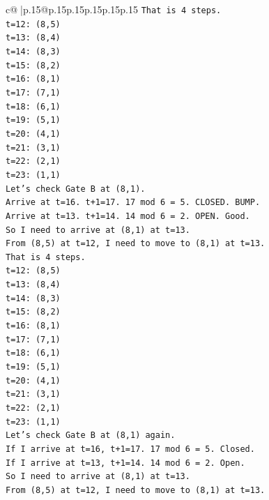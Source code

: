 \documentclass{article}
\begin{document}
{\begin{supertabular}{c@{$\;$}|p{.15\linewidth}@{}p{.15\linewidth}p{.15\linewidth}p{.15\linewidth}p{.15\linewidth}p{.15\linewidth}}
{{{\texttt{That is 4 steps.} \\
\texttt{t=12: (8,5)} \\
\texttt{t=13: (8,4)} \\
\texttt{t=14: (8,3)} \\
\texttt{t=15: (8,2)} \\
\texttt{t=16: (8,1)} \\
\texttt{t=17: (7,1)} \\
\texttt{t=18: (6,1)} \\
\texttt{t=19: (5,1)} \\
\texttt{t=20: (4,1)} \\
\texttt{t=21: (3,1)} \\
\texttt{t=22: (2,1)} \\
\texttt{t=23: (1,1)} \\
\texttt{Let's check Gate B at (8,1).} \\
\texttt{Arrive at t=16. t+1=17. 17 mod 6 = 5. CLOSED. BUMP.} \\
\texttt{Arrive at t=13. t+1=14. 14 mod 6 = 2. OPEN. Good.} \\
\texttt{So I need to arrive at (8,1) at t=13.} \\
\texttt{From (8,5) at t=12, I need to move to (8,1) at t=13.} \\
\texttt{That is 4 steps.} \\
\texttt{t=12: (8,5)} \\
\texttt{t=13: (8,4)} \\
\texttt{t=14: (8,3)} \\
\texttt{t=15: (8,2)} \\
\texttt{t=16: (8,1)} \\
\texttt{t=17: (7,1)} \\
\texttt{t=18: (6,1)} \\
\texttt{t=19: (5,1)} \\
\texttt{t=20: (4,1)} \\
\texttt{t=21: (3,1)} \\
\texttt{t=22: (2,1)} \\
\texttt{t=23: (1,1)} \\
\texttt{Let's check Gate B at (8,1) again.} \\
\texttt{If I arrive at t=16, t+1=17. 17 mod 6 = 5. Closed.} \\
\texttt{If I arrive at t=13, t+1=14. 14 mod 6 = 2. Open.} \\
\texttt{So I need to arrive at (8,1) at t=13.} \\
\texttt{From (8,5) at t=12, I need to move to (8,1) at t=13.} \\
}}}
\end{supertabular}}
\end{document}
